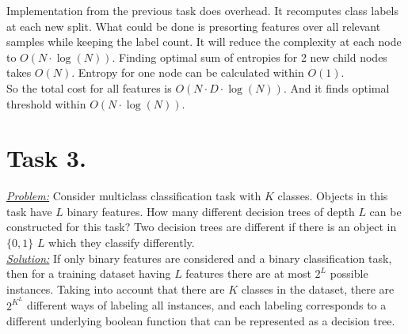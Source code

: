 \documentclass[a4paper,12pt]{article}
\begin{document}
Implementation from the previous task does
overhead. It recomputes class labels at each new split. What could be done is
presorting features over all relevant samples while keeping the label count. It
will reduce the complexity at each node to \(O(N\cdot \log(N))\). Finding
optimal sum of entropies for 2 new child nodes takes \(O(N)\). Entropy for one
node can be calculated within \(O(1)\).\\
So the total cost for all features is \(O(N\cdot D\cdot \log(N))\). And it finds optimal threshold within \(O(N\cdot \log(N))\).

\section*{Task 3.}
\underline{\textit{Problem:}} Consider multiclass
classification task with \(K\) classes. Objects in this task have \(L\) binary
features.  How many different decision trees of depth \(L\) can be constructed
for this task? Two decision trees are different if there is an object in \(\{0,
1\}\) \(L\) which they classify differently.\\
\newline
\underline{\textit{Solution:}} If only binary features are considered and a
binary classification task, then for a training dataset having $L$ features
there are at most \(2^L\) possible instances. Taking into account that there
are $K$ classes in the dataset, there are \(2^{K^L}\) different ways of labeling
all instances, and each labeling corresponds to a different underlying boolean
function that can be represented as a decision tree.
\end{document}
